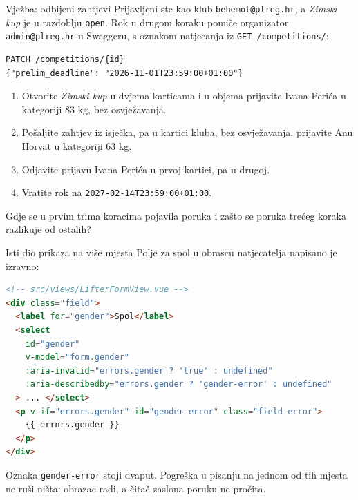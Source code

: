 \begin{frame}[fragile]{Vježba: odbijeni zahtjevi}
Prijavljeni ste kao klub \texttt{behemot@plreg.hr}, a \emph{Zimski kup} je u razdoblju \texttt{open}. Rok u drugom koraku pomiče organizator \texttt{admin@plreg.hr} u Swaggeru, s oznakom natjecanja iz \texttt{GET /competitions/}:

\begin{lstlisting}
PATCH /competitions/{id}
{"prelim_deadline": "2026-11-01T23:59:00+01:00"}
\end{lstlisting}

\vspace{-0.1em}
\begin{enumerate}
  \itemsep0.2em
  \item Otvorite \emph{Zimski kup} u dvjema karticama i u objema prijavite Ivana Perića u kategoriji 83 kg, bez osvježavanja.
  \item Pošaljite zahtjev iz isječka, pa u kartici kluba, bez osvježavanja, prijavite Anu Horvat u kategoriji 63 kg.
  \item Odjavite prijavu Ivana Perića u prvoj kartici, pa u drugoj.
  \item Vratite rok na \texttt{2027-02-14T23:59:00+01:00}.
\end{enumerate}

\vspace{0.2em}
Gdje se u prvim trima koracima pojavila poruka i zašto se poruka trećeg koraka razlikuje od ostalih?
\end{frame}


\begin{frame}[fragile]{Isti dio prikaza na više mjesta}
Polje za spol u obrascu natjecatelja napisano je izravno:

\begin{lstlisting}[language=html]
<!-- src/views/LifterFormView.vue -->
<div class="field">
  <label for="gender">Spol</label>
  <select
    id="gender"
    v-model="form.gender"
    :aria-invalid="errors.gender ? 'true' : undefined"
    :aria-describedby="errors.gender ? 'gender-error' : undefined"
  > ... </select>
  <p v-if="errors.gender" id="gender-error" class="field-error">
    {{ errors.gender }}
  </p>
</div>
\end{lstlisting}

\vspace{0.2em}
Oznaka \texttt{gender-error} stoji dvaput. Pogreška u pisanju na jednom od tih mjesta ne ruši ništa: obrazac radi, a čitač zaslona poruku ne pročita.
\end{frame}

